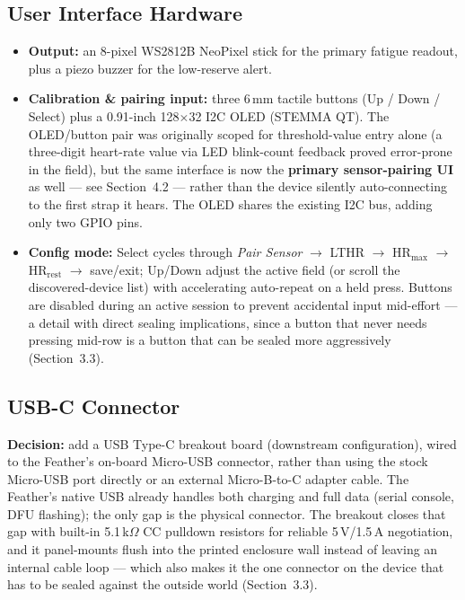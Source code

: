 \documentclass[11pt]{article}
\begin{document}
\subsection{User Interface Hardware}
\begin{itemize}[topsep=2pt,itemsep=2pt]
    \item \textbf{Output:} an 8-pixel WS2812B NeoPixel stick for the primary fatigue readout, plus a piezo buzzer for the low-reserve alert.
    \item \textbf{Calibration \& pairing input:} three 6\,mm tactile buttons (Up / Down / Select) plus a 0.91-inch 128$\times$32 I2C OLED (STEMMA QT). The OLED/button pair was originally scoped for threshold-value entry alone (a three-digit heart-rate value via LED blink-count feedback proved error-prone in the field), but the same interface is now the \textbf{primary sensor-pairing UI} as well --- see Section~4.2 --- rather than the device silently auto-connecting to the first strap it hears. The OLED shares the existing I2C bus, adding only two GPIO pins.
    \item \textbf{Config mode:} Select cycles through \emph{Pair Sensor} $\to$ LTHR $\to$ HR$_{\text{max}}$ $\to$ HR$_{\text{rest}}$ $\to$ save/exit; Up/Down adjust the active field (or scroll the discovered-device list) with accelerating auto-repeat on a held press. Buttons are disabled during an active session to prevent accidental input mid-effort --- a detail with direct sealing implications, since a button that never needs pressing mid-row is a button that can be sealed more aggressively (Section~3.3).
\end{itemize}

\subsection{USB-C Connector}
\textbf{Decision:} add a USB Type-C breakout board (downstream configuration), wired to the Feather's on-board Micro-USB connector, rather than using the stock Micro-USB port directly or an external Micro-B-to-C adapter cable. The Feather's native USB already handles both charging and full data (serial console, DFU flashing); the only gap is the physical connector. The breakout closes that gap with built-in 5.1\,k$\Omega$ CC pulldown resistors for reliable 5\,V/1.5\,A negotiation, and it panel-mounts flush into the printed enclosure wall instead of leaving an internal cable loop --- which also makes it the one connector on the device that has to be sealed against the outside world (Section~3.3).
\end{document}
